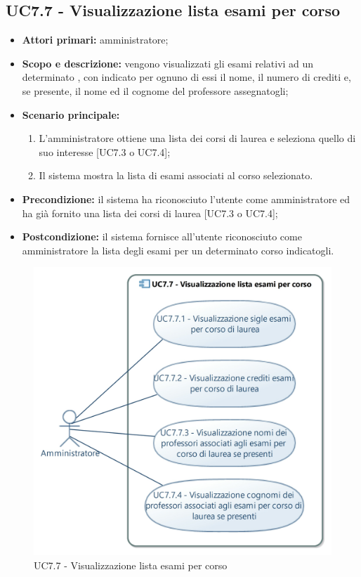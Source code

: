 \documentclass[AnalisiDeiRequisiti.tex]{subfiles}
\begin{document}
\subsection{UC7.7 - Visualizzazione lista esami per corso}
\begin{itemize}
	\item \textbf{Attori primari:} amministratore;
	\item \textbf{Scopo e descrizione:} vengono visualizzati gli esami relativi ad un determinato , con indicato per ognuno di essi il nome, il numero di crediti e, se presente, il nome ed il cognome del professore assegnatogli;
	\item \textbf{Scenario principale:}
	\begin{enumerate}
		\item L'amministratore ottiene una lista dei corsi di laurea e seleziona quello di suo interesse [UC7.3 o UC7.4];
		\item Il sistema mostra la lista di esami associati al corso selezionato.
	\end{enumerate}
	\item \textbf{Precondizione:} il sistema ha riconosciuto l'utente come amministratore ed ha già fornito una lista dei corsi di laurea [UC7.3 o UC7.4]; 
	\item \textbf{Postcondizione:} il sistema fornisce all'utente riconosciuto come amministratore la lista degli esami per un determinato corso indicatogli.
\end{itemize}
\begin{figure}[H]
	\centering
	\includegraphics[width=0.8\linewidth]{UC7_7.jpg}
	\caption{UC7.7 - Visualizzazione lista esami per corso}
	\label{fig:UC7.7 - Visualizzazione lista esami per corso}
\end{figure}
\end{document}
